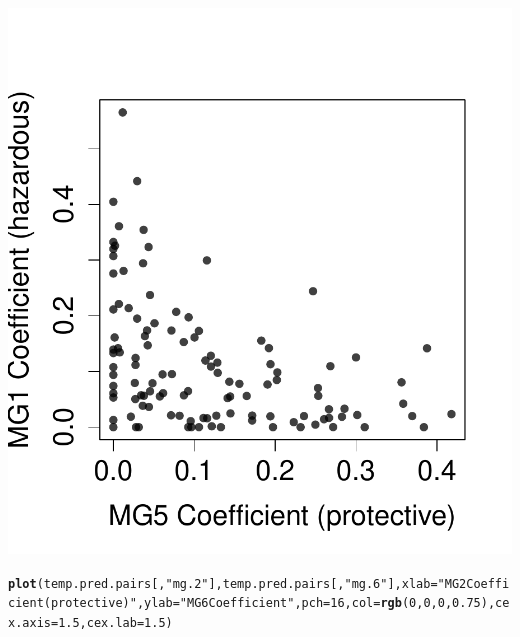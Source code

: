 \documentclass{article}\usepackage[]{graphicx}\usepackage[]{color}
\makeatletter
\def\maxwidth{ %
  \ifdim\Gin@nat@width>\linewidth
    \linewidth
  \else
    \Gin@nat@width
  \fi
}
\newcommand{\hlnum}[1]{\textcolor[rgb]{0.686,0.059,0.569}{#1}}%
\newcommand{\hlstr}[1]{\textcolor[rgb]{0.192,0.494,0.8}{#1}}%
\newcommand{\hlstd}[1]{\textcolor[rgb]{0.345,0.345,0.345}{#1}}%
\newcommand{\hlkwc}[1]{\textcolor[rgb]{0.333,0.667,0.333}{#1}}%
\newcommand{\hlkwd}[1]{\textcolor[rgb]{0.737,0.353,0.396}{\textbf{#1}}}%
\newenvironment{kframe}{%
 \def\at@end@of@kframe{}%
 \ifinner\ifhmode%
  \def\at@end@of@kframe{\end{minipage}}%
  \begin{minipage}{\columnwidth}%
 \fi\fi%
 \def\FrameCommand##1{\hskip\@totalleftmargin \hskip-\fboxsep
 \colorbox{shadecolor}{##1}\hskip-\fboxsep
     \hskip-\linewidth \hskip-\@totalleftmargin \hskip\columnwidth}%
 \MakeFramed {\advance\hsize-\width
   \@totalleftmargin\z@ \linewidth\hsize
   \@setminipage}}%
 {\par\unskip\endMakeFramed%
 \at@end@of@kframe}
\newenvironment{knitrout}{}{} %
\makeatother
\begin{document}
\begin{knitrout}
{\centering \includegraphics[width=\maxwidth]{figure/metagene-pairs-8} 

}


\begin{kframe}\begin{alltt}
\hlkwd{plot}\hlstd{(temp.pred.pairs[,}\hlstr{"mg.2"}\hlstd{], temp.pred.pairs[,}\hlstr{"mg.6"}\hlstd{],} \hlkwc{xlab} \hlstd{=} \hlstr{"MG2 Coefficient (protective)"}\hlstd{,} \hlkwc{ylab} \hlstd{=} \hlstr{"MG6 Coefficient"}\hlstd{,} \hlkwc{pch} \hlstd{=} \hlnum{16}\hlstd{,} \hlkwc{col} \hlstd{=} \hlkwd{rgb}\hlstd{(}\hlnum{0}\hlstd{,} \hlnum{0}\hlstd{,} \hlnum{0}\hlstd{,} \hlnum{0.75}\hlstd{),} \hlkwc{cex.axis} \hlstd{=} \hlnum{1.5}\hlstd{,} \hlkwc{cex.lab} \hlstd{=} \hlnum{1.5}\hlstd{)}
\end{alltt}
\end{kframe}


\end{knitrout}
\end{document}
